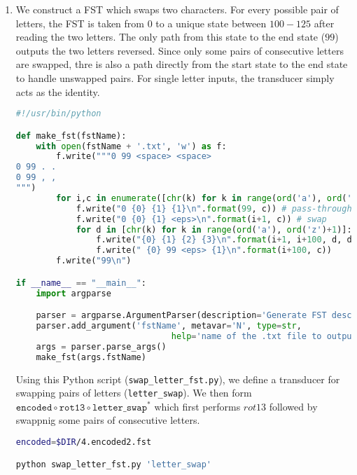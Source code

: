 \documentclass[a4paper,oneside,reqno]{amsart}
\begin{document}
\begin{enumerate}[label=\arabic*.]
\begin{enumerate}[label=(\alph*)]
  \item We construct a FST which swaps two characters.  For every
    possible pair of letters, the FST is taken from $0$ to a unique state
    between $100-125$ after reading the two letters. The only path from this
    state to the end state ($99$) outputs the two letters reversed. Since only
    some pairs of consecutive letters are swapped, thre is also a path directly
    from the start state to the end state to handle unswapped pairs. For single
    letter inputs, the transducer simply acts as the identity.
    \begin{lstlisting}[language=python]
#!/usr/bin/python

def make_fst(fstName):
    with open(fstName + '.txt', 'w') as f:
        f.write("""0 99 <space> <space>
0 99 . .
0 99 , ,
""")
        for i,c in enumerate([chr(k) for k in range(ord('a'), ord('z')+1)]):
            f.write("0 {0} {1} {1}\n".format(99, c)) # pass-through
            f.write("0 {0} {1} <eps>\n".format(i+1, c)) # swap
            for d in [chr(k) for k in range(ord('a'), ord('z')+1)]:
                f.write("{0} {1} {2} {3}\n".format(i+1, i+100, d, d))
                f.write(" {0} 99 <eps> {1}\n".format(i+100, c))
        f.write("99\n")

if __name__ == "__main__":
    import argparse

    parser = argparse.ArgumentParser(description='Generate FST description for swapping letters')
    parser.add_argument('fstName', metavar='N', type=str,
                               help='name of the .txt file to output')
    args = parser.parse_args()
    make_fst(args.fstName)
    \end{lstlisting}

    Using this Python script (\texttt{swap\_letter\_fst.py}), we define a transducer
    for swapping pairs of letters (\texttt{letter\_swap}). We then form
    $\texttt{encoded} \circ \texttt{rot13} \circ \texttt{letter\_swap}^*$ which
    first performs $rot13$ followed by swappnig some pairs of consecutive letters.
    \begin{lstlisting}[language=bash]
encoded=$DIR/4.encoded2.fst

python swap_letter_fst.py 'letter_swap'


\end{lstlisting}
\end{enumerate}
\end{enumerate}
\end{document}
